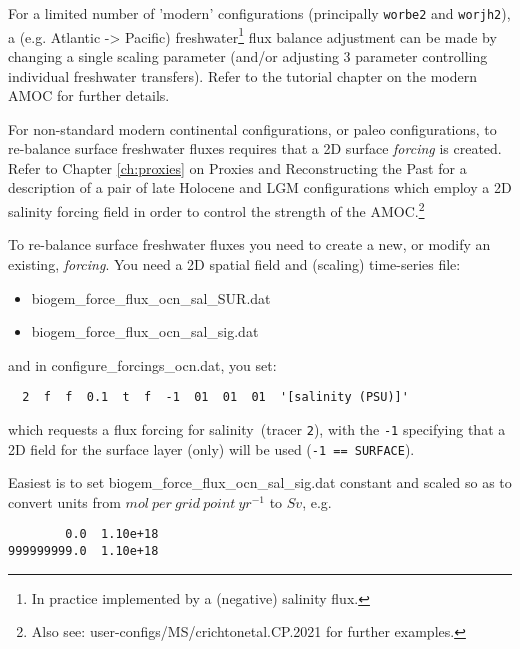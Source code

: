For a limited number of 'modern' configurations (principally \texttt{worbe2} and \texttt{worjh2}), a (e.g. Atlantic -> Pacific) freshwater\footnote{In practice implemented by a (negative) salinity flux.} flux balance adjustment can be made by changing a single scaling parameter (and/or adjusting 3 parameter controlling individual freshwater transfers). Refer to the tutorial chapter on the modern AMOC for further details.

For non-standard modern continental configurations, or paleo configurations, to re-balance surface freshwater fluxes requires that a 2D surface \textit{forcing} is created. Refer to Chapter \ref{ch:proxies} on Proxies and Reconstructing the Past for a description of a pair of late Holocene and LGM configurations which employ a 2D salinity forcing field in order to control the strength of the AMOC.\footnote{Also see: \textsf{\footnotesize user-configs/MS/crichtonetal.CP.2021} for further examples.}

To re-balance surface freshwater fluxes you need to create a new, or modify an existing, \textit{forcing}. You need a 2D spatial field and (scaling) time-series file:
\vspace{1mm}
\begin{itemize}[noitemsep]
\item \textsf{\footnotesize biogem\_force\_flux\_ocn\_sal\_SUR.dat}
\item \textsf{\footnotesize biogem\_force\_flux\_ocn\_sal\_sig.dat}
\end{itemize}
\vspace{1mm}
and in \textsf{\footnotesize configure\_forcings\_ocn.dat}, you set:
\vspace{-1mm}\small\begin{verbatim}
  2  f  f  0.1  t  f  -1  01  01  01  '[salinity (PSU)]'
\end{verbatim}\normalsize\vspace{-1mm}
which requests a flux forcing for salinity\ (tracer \texttt{2}), with the \texttt{-1} specifying that a 2D field for the surface layer (only) will be used (\texttt{-1 == SURFACE}).

Easiest is to set \textsf{\footnotesize biogem\_force\_flux\_ocn\_sal\_sig.dat} constant and scaled so as to convert units from \(mol\:per\:grid\:point\:yr^{-1}\) to \(Sv\), e.g.
\vspace{-1mm}\small\begin{verbatim}
        0.0  1.10e+18
999999999.0  1.10e+18
\end{verbatim}\normalsize\vspace{-1mm}

